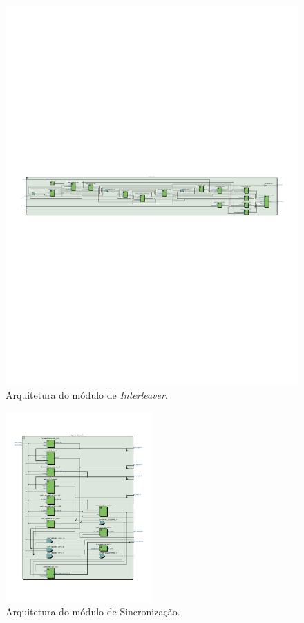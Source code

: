 \begin{figure}[h]
	\caption{\label{figure:interleaver-rtl}Arquitetura do módulo de \textit{Interleaver}.}
	\centering
	\includegraphics[width=1\textwidth, trim={0 12cm 0 12.5cm}, clip]{interleaver/rtl.pdf}
\end{figure}
\begin{figure}[h]
	\caption{\label{figure:sync-rtl}Arquitetura do módulo de Sincronização.}
	\centering
	\includegraphics[width=0.5\textwidth, trim={0 2cm 0 3cm}, clip]{sync/rtl.pdf}
\end{figure}
